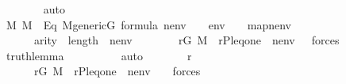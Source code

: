\begin{isabellebody}
\ \ \ \ \ \ \isamarkupfalse%
\ auto\isanewline
\ \ \ \ \ \ \ \ \isanewline
\ \ \ \ \isamarkupfalse%
\ {\isacartoucheopen}{\isasymtheta}{\isasymin}M{\isacartoucheclose}\ {\isacartoucheopen}{\isasympi}{\isasymin}M{\isacartoucheclose}\ \ Eq{}\ {\isacartoucheopen}M{\isacharunderscore}{\kern0pt}generic{\isacharparenleft}{\kern0pt}G{\isacharparenright}{\kern0pt}{\isacartoucheclose}\ {\isacartoucheopen}{\isasymphi}{\isasymin}formula{\isacartoucheclose}\ {\isacartoucheopen}nenv\ {\isasymin}\ {\isacharunderscore}{\kern0pt}\ {\isacartoucheclose}\ {\isacartoucheopen}env\ {\isacharequal}{\kern0pt}\ {\isacharunderscore}{\kern0pt}\ {\isacartoucheclose}\ map{\isacharunderscore}{\kern0pt}nenv\ \isanewline
\ \ \ \ \ \ {\isacartoucheopen}arity{\isacharparenleft}{\kern0pt}{\isacharquery}{\kern0pt}{\isasymchi}{\isacharparenright}{\kern0pt}\ {\isasymle}\ length{\isacharparenleft}{\kern0pt}{\isacharbrackleft}{\kern0pt}{\isasymtheta}{\isacharbrackright}{\kern0pt}\ {\isacharat}{\kern0pt}\ nenv\ {\isacharat}{\kern0pt}\ {\isacharbrackleft}{\kern0pt}{\isasympi}{\isacharbrackright}{\kern0pt}{\isacharparenright}{\kern0pt}{\isacartoucheclose}\isanewline
\ \ \ \ \isamarkupfalse%
\ {\isachardoublequoteopen}{\isacharparenleft}{\kern0pt}{\isasymexists}r{\isasymin}G{\isachardot}{\kern0pt}\ M{\isacharcomma}{\kern0pt}\ \ {\isacharbrackleft}{\kern0pt}r{\isacharcomma}{\kern0pt}P{\isacharcomma}{\kern0pt}leq{\isacharcomma}{\kern0pt}one{\isacharcomma}{\kern0pt}{\isasymtheta}{\isacharbrackright}{\kern0pt}\ {\isacharat}{\kern0pt}\ nenv\ {\isacharat}{\kern0pt}{\isacharbrackleft}{\kern0pt}{\isasympi}{\isacharbrackright}{\kern0pt}\ {\isasymTurnstile}\ forces{\isacharparenleft}{\kern0pt}{\isacharquery}{\kern0pt}{\isasymchi}{\isacharparenright}{\kern0pt}{\isacharparenright}{\kern0pt}{\isachardoublequoteclose}\isanewline
\ \ \ \ \ \ \isamarkupfalse%
\ truth{\isacharunderscore}{\kern0pt}lemma\ \ \isanewline
\ \ \ \ \ \ \isamarkupfalse%
\ auto\isanewline
\ \ \ \ \isamarkupfalse%
\ \isamarkupfalse%
\ r\ \ \ \ \ \ \ \isanewline
\ \ \ \ \ \ {\isachardoublequoteopen}r{\isasymin}G{\isachardoublequoteclose}\ {\isachardoublequoteopen}M{\isacharcomma}{\kern0pt}\ \ {\isacharbrackleft}{\kern0pt}r{\isacharcomma}{\kern0pt}P{\isacharcomma}{\kern0pt}leq{\isacharcomma}{\kern0pt}one{\isacharcomma}{\kern0pt}{\isasymtheta}{\isacharbrackright}{\kern0pt}\ {\isacharat}{\kern0pt}\ nenv\ {\isacharat}{\kern0pt}\ {\isacharbrackleft}{\kern0pt}{\isasympi}{\isacharbrackright}{\kern0pt}\ {\isasymTurnstile}\ forces{\isacharparenleft}{\kern0pt}{\isacharquery}{\kern0pt}{\isasymchi}{\isacharparenright}{\kern0pt}{\isachardoublequoteclose}\ \isamarkupfalse%

\end{isabellebody}
